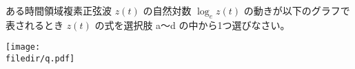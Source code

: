 ある時間領域複素正弦波  $z(t)$ の自然対数 $\log_e z(t)$ の動きが以下のグラフで表されるとき $z(t)$ の式を選択肢 a〜d の中から1つ選びなさい。

\centering\texttt{[image: \\filedir/q.pdf]}
